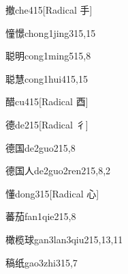 \begin{verbete}{撤}{che4}{15}[Radical 手]
\end{verbete}

\begin{verbete}{憧憬}{chong1jing3}{15,15}
\end{verbete}

\begin{verbete}{聪明}{cong1ming5}{15,8}
\end{verbete}

\begin{verbete}{聪慧}{cong1hui4}{15,15}
\end{verbete}

\begin{verbete}{醋}{cu4}{15}[Radical ⾣]
\end{verbete}

\begin{verbete}{德}{de2}{15}[Radical 彳]
\end{verbete}

\begin{verbete}{德国}{de2guo2}{15,8}
\end{verbete}

\begin{verbete}{德国人}{de2guo2ren2}{15,8,2}
\end{verbete}

\begin{verbete}{懂}{dong3}{15}[Radical 心]
\end{verbete}

\begin{verbete}{蕃茄}{fan1qie2}{15,8}
\end{verbete}

\begin{verbete}{橄榄球}{gan3lan3qiu2}{15,13,11}
\end{verbete}

\begin{verbete}{稿纸}{gao3zhi3}{15,7}
\end{verbete}

